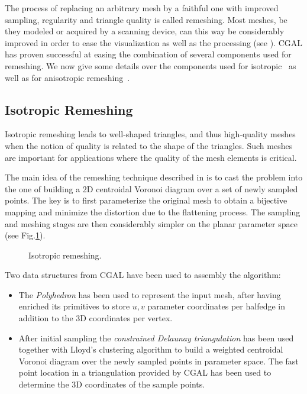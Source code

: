 \label{sec:remeshing}


The process of replacing an arbitrary mesh by a faithful one with
improved sampling, regularity and triangle quality is called
remeshing. Most meshes, be they modeled or acquired by a scanning
device, can this way be considerably improved in order to ease the
visualization as well as the processing (see \cite{ss-dgp-01}). CGAL
has proven successful at easing the combination of several components
used for remeshing. We now give some details over the components used
for isotropic~\cite{acdi-isr-03} as well as for anisotropic
remeshing~\cite{acdld-apr-03}.

\subsection{Isotropic Remeshing}


Isotropic remeshing leads to well-shaped triangles, and thus
high-quality meshes when the notion of quality is related to the shape
of the triangles. Such meshes are important for applications where the
quality of the mesh elements is critical.


The main idea of the remeshing technique described in
\cite{acdi-isr-03} is to cast the problem into the
one of building a 2D centroidal Voronoi diagram over a set of newly
sampled points. The key is to first parameterize the original mesh to
obtain a bijective mapping and minimize the distortion due to the
flattening process. The sampling and meshing stages are then
considerably simpler on the planar parameter space (see
Fig.\ref{fig:isotropic}).

\begin{figure}
  \centering
  \caption{Isotropic remeshing.}
  \label{fig:isotropic}
\end{figure}



Two data structures from CGAL have been used to assembly the
algorithm:

\begin{itemize}

\item 
The \emph{Polyhedron} has been used to represent the input mesh, after
having enriched its primitives to store $u,v$ parameter coordinates
per halfedge in addition to the 3D coordinates per vertex.

\item 
After initial sampling the \emph{constrained Delaunay triangulation}
has been used together with Lloyd's clustering algorithm to build a
weighted centroidal Voronoi diagram over the newly sampled points in
parameter space. The fast point location in a triangulation provided
by CGAL has been used to determine the 3D coordinates of the sample
points.

\end{itemize}

